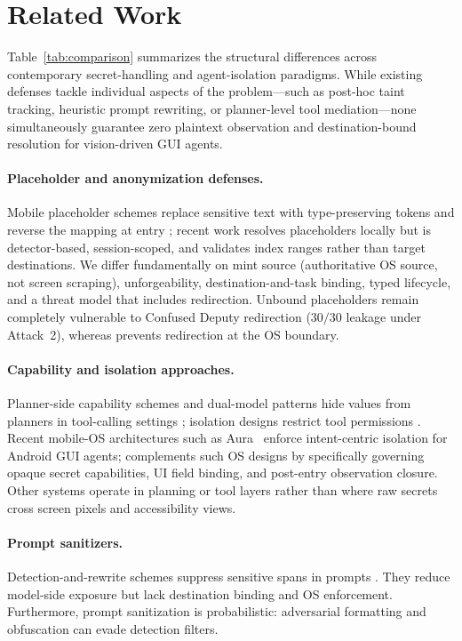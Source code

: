 \section{Related Work}
\label{sec:related}

Table~\ref{tab:comparison} summarizes the structural differences across contemporary secret-handling and agent-isolation paradigms. While existing defenses tackle individual aspects of the problem---such as post-hoc taint tracking, heuristic prompt rewriting, or planner-level tool mediation---none simultaneously guarantee zero plaintext observation and destination-bound resolution for vision-driven GUI agents.

\paragraph{Placeholder and anonymization defenses.} Mobile placeholder schemes replace sensitive text with type-preserving tokens and reverse the mapping at entry \cite{zhao2026anonymization}; recent work resolves placeholders locally but is detector-based, session-scoped, and validates index ranges rather than target destinations. We differ fundamentally on mint source (authoritative OS source, not screen scraping), unforgeability, destination-and-task binding, typed lifecycle, and a threat model that includes redirection. Unbound placeholders remain completely vulnerable to Confused Deputy redirection ($30/30$ leakage under Attack~2), whereas \SH{} prevents redirection at the OS boundary.

\paragraph{Capability and isolation approaches.} Planner-side capability schemes and dual-model patterns hide values from planners in tool-calling settings \cite{debenedetti2025camel,costa2025fides}; isolation designs restrict tool permissions \cite{bagdasarian2024airgap,wu2025isolategpt,shi2025progent}. Recent mobile-OS architectures such as Aura~\cite{zou2026aura} enforce intent-centric isolation for Android GUI agents; \SH{} complements such OS designs by specifically governing opaque secret capabilities, UI field binding, and post-entry observation closure. Other systems operate in planning or tool layers rather than where raw secrets cross screen pixels and accessibility views.

\paragraph{Prompt sanitizers.} Detection-and-rewrite schemes suppress sensitive spans in prompts \cite{siyan2025papillon,zeng2025privacyrestore,chong2024casper}. They reduce model-side exposure but lack destination binding and OS enforcement. Furthermore, prompt sanitization is probabilistic: adversarial formatting and obfuscation can evade detection filters.

